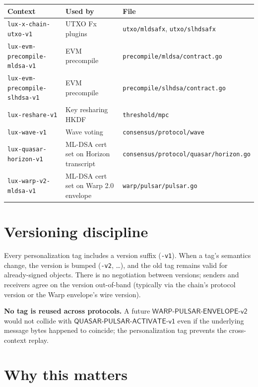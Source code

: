\documentclass[11pt,a4paper]{article}
\begin{document}
\begin{tabularx}{\textwidth}{@{}p{}p{}X@{}}
  \toprule
  \textbf{Context} & \textbf{Used by} & \textbf{File} \\
  \midrule
  \texttt{lux-x-chain-utxo-v1}            & UTXO Fx plugins & \texttt{utxo/mldsafx}, \texttt{utxo/slhdsafx} \\
  \texttt{lux-evm-precompile-mldsa-v1}    & EVM precompile & \texttt{precompile/mldsa/contract.go} \\
  \texttt{lux-evm-precompile-slhdsa-v1}   & EVM precompile & \texttt{precompile/slhdsa/contract.go} \\
  \texttt{lux-reshare-v1}                 & Key resharing HKDF & \texttt{threshold/mpc} \\
  \texttt{lux-wave-v1}                    & Wave voting & \texttt{consensus/protocol/wave} \\
  \texttt{lux-quasar-horizon-v1}          & ML-DSA cert set on Horizon transcript & \texttt{consensus/protocol/quasar/horizon.go} \\
  \texttt{lux-warp-v2-mldsa-v1}           & ML-DSA cert set on Warp 2.0 envelope & \texttt{warp/pulsar/pulsar.go} \\
  \bottomrule
\end{tabularx}

\section{Versioning discipline}

Every personalization tag includes a version suffix (\texttt{-v1}). When a tag's semantics change, the version is bumped (\texttt{-v2}, \ldots), and the old tag remains valid for already-signed objects. There is no negotiation between versions; senders and receivers agree on the version out-of-band (typically via the chain's protocol version or the Warp envelope's wire version).

\textbf{No tag is reused across protocols.} A future $\mathsf{WARP\text{-}PULSAR\text{-}ENVELOPE\text{-}v2}$ would not collide with $\mathsf{QUASAR\text{-}PULSAR\text{-}ACTIVATE\text{-}v1}$ even if the underlying message bytes happened to coincide; the personalization tag prevents the cross-context replay.

\section{Why this matters}
\end{document}
